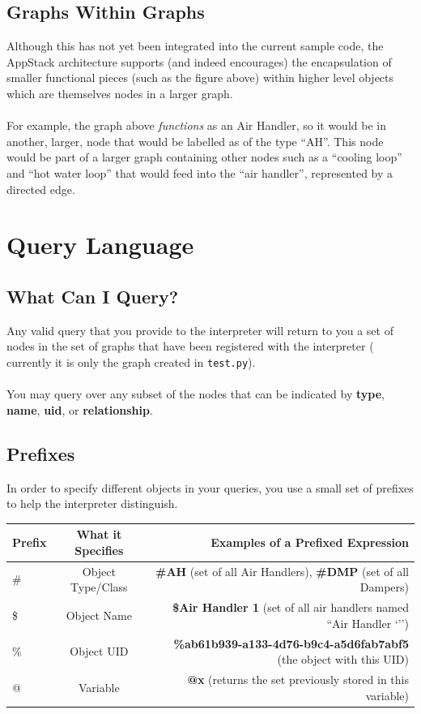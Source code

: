 \subsection{Graphs Within Graphs} %
\label{sub:graphs_within_graphs}
Although this has not yet been integrated into the current sample code, the AppStack architecture supports (and indeed encourages) the encapsulation of smaller functional pieces (such as the figure above) within higher level objects which are themselves nodes in a larger graph.
\\\\
For example, the graph above \emph{functions} as an Air Handler, so it would be in another, larger, node that would be labelled as of the type ``AH''. This node would be part of a larger graph containing other nodes such as a ``cooling loop'' and ``hot water loop'' that would feed into the ``air handler'', represented by a directed edge.


\section{Query Language} %
\label{sec:query_language}
\subsection{What Can I Query?} %
\label{sub:what_can_i_query_}
Any valid query that you provide to the interpreter will return to you a set of nodes in the set of graphs that have been registered with the interpreter ( currently it is only the graph created in \verb+test.py+).
\\\\
You may query over any subset of the nodes that can be indicated by {\bf type}, {\bf name}, {\bf uid}, or {\bf relationship}.

\subsection{Prefixes} %
\label{sub:prefixes}
In order to specify different objects in your queries, you use a small set of prefixes to help the interpreter distinguish.
\begin{center}
\begin{tabular}{| l | c | r |}
\hline
Prefix & What it Specifies & Examples of a {\bf Prefixed Expression}  \\ \hline
\#	&	Object Type/Class & \textbf{\#AH} (set of all Air Handlers), \textbf{\#DMP} (set of all Dampers) \\ \hline
\$ 	&	Object Name	& \textbf{\$Air Handler 1} (set of all air handlers named ``Air Handler `'') \\ \hline
\%	&	Object UID & \textbf{\%ab61b939-a133-4d76-b9c4-a5d6fab7abf5} (the object with this UID) \\ \hline
@	&	Variable	& \textbf{@x} (returns the set previously stored in this variable) \\ \hline
\end{tabular}
\end{center}

